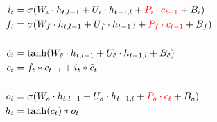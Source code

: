 \documentclass{article}
\begin{document}
\begin{align*}
    i_t &= \sigma(W_i \cdot h_{t,l-1} + U_i \cdot h_{t-1,l} + \textcolor{red}{P_i \cdot c_{t-1}} + B_i) \\
    f_t &= \sigma(W_f \cdot h_{t,l-1} + U_f \cdot h_{t-1,l} + \textcolor{red}{P_f \cdot c_{t-1}} + B_f) \\
    & \\
    \tilde{c}_t &= \tanh(W_{\tilde{c}} \cdot h_{t,l-1} + U_{\tilde{c}} \cdot h_{t-1,l} + B_{\tilde{c}}) \\
    c_t &= f_t * c_{t-1} + i_t * \tilde{c}_t \\
    & \\
    o_t &= \sigma(W_o \cdot h_{t,l-1} + U_o \cdot h_{t-1,l} + \textcolor{red}{P_o \cdot c_{t}} + B_o) \\
    h_t &= \tanh(c_t) * o_t
\end{align*}
\end{document}
